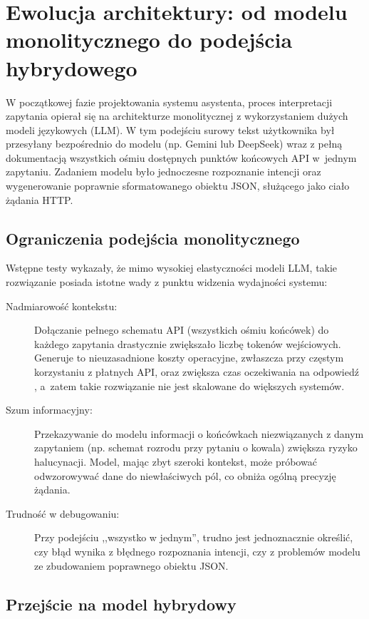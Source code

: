 \section{Ewolucja architektury: od modelu monolitycznego do podejścia hybrydowego}

W początkowej fazie projektowania systemu asystenta, proces interpretacji zapytania opierał się na architekturze monolitycznej z wykorzystaniem dużych modeli językowych (LLM). W tym podejściu surowy tekst użytkownika był przesyłany bezpośrednio do modelu (np. Gemini lub DeepSeek) wraz z pełną dokumentacją wszystkich ośmiu dostępnych punktów końcowych API w~jednym zapytaniu. Zadaniem modelu było jednoczesne rozpoznanie intencji oraz wygenerowanie poprawnie sformatowanego obiektu JSON, służącego jako ciało żądania HTTP.

\subsection{Ograniczenia podejścia monolitycznego}

Wstępne testy wykazały, że mimo wysokiej elastyczności modeli LLM, takie rozwiązanie posiada istotne wady z punktu widzenia wydajności systemu:

\begin{description}
	\item[Nadmiarowość kontekstu:] Dołączanie pełnego schematu API (wszystkich ośmiu końcówek) do każdego zapytania drastycznie zwiększało liczbę tokenów wejściowych. Generuje to nieuzasadnione koszty operacyjne, zwłaszcza przy częstym korzystaniu z płatnych API, oraz zwiększa czas oczekiwania na odpowiedź \cite{liu2023}, a~zatem takie rozwiązanie nie jest skalowane do większych systemów.
    
	\item[Szum informacyjny:] Przekazywanie do modelu informacji o końcówkach niezwiązanych z danym zapytaniem (np. schemat rozrodu przy pytaniu o kowala) zwiększa ryzyko halucynacji. Model, mając zbyt szeroki kontekst, może próbować odwzorowywać dane do niewłaściwych pól, co obniża ogólną precyzję żądania.
    
	\item[Trudność w debugowaniu:] Przy podejściu ,,wszystko w jednym'', trudno jest jednoznacznie określić, czy błąd wynika z błędnego rozpoznania intencji, czy z problemów modelu ze zbudowaniem poprawnego obiektu JSON.
\end{description}

\subsection{Przejście na model hybrydowy}

